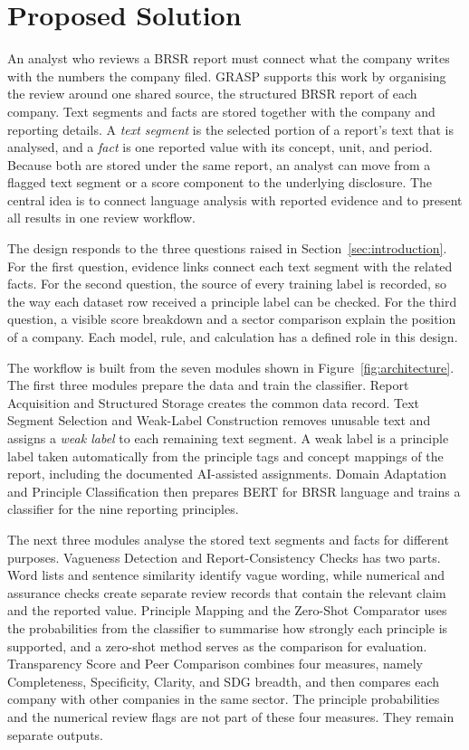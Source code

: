 \section{Proposed Solution}
\label{sec:proposed}

An analyst who reviews a BRSR report must connect what the company writes with the numbers the company filed. GRASP supports this work by organising the review around one shared source, the structured BRSR report of each company. Text segments and facts are stored together with the company and reporting details. A \emph{text segment} is the selected portion of a report's text that is analysed, and a \emph{fact} is one reported value with its concept, unit, and period. Because both are stored under the same report, an analyst can move from a flagged text segment or a score component to the underlying disclosure. The central idea is to connect language analysis with reported evidence and to present all results in one review workflow.

The design responds to the three questions raised in Section~\ref{sec:introduction}. For the first question, evidence links connect each text segment with the related facts. For the second question, the source of every training label is recorded, so the way each dataset row received a principle label can be checked. For the third question, a visible score breakdown and a sector comparison explain the position of a company. Each model, rule, and calculation has a defined role in this design.

The workflow is built from the seven modules shown in Figure~\ref{fig:architecture}. The first three modules prepare the data and train the classifier. Report Acquisition and Structured Storage creates the common data record. Text Segment Selection and Weak-Label Construction removes unusable text and assigns a \emph{weak label} to each remaining text segment. A weak label is a principle label taken automatically from the principle tags and concept mappings of the report, including the documented AI-assisted assignments. Domain Adaptation and Principle Classification then prepares BERT for BRSR language and trains a classifier for the nine reporting principles.

The next three modules analyse the stored text segments and facts for different purposes. Vagueness Detection and Report-Consistency Checks has two parts. Word lists and sentence similarity identify vague wording, while numerical and assurance checks create separate review records that contain the relevant claim and the reported value. Principle Mapping and the Zero-Shot Comparator uses the probabilities from the classifier to summarise how strongly each principle is supported, and a zero-shot method serves as the comparison for evaluation. Transparency Score and Peer Comparison combines four measures, namely Completeness, Specificity, Clarity, and SDG breadth, and then compares each company with other companies in the same sector. The principle probabilities and the numerical review flags are not part of these four measures. They remain separate outputs.

